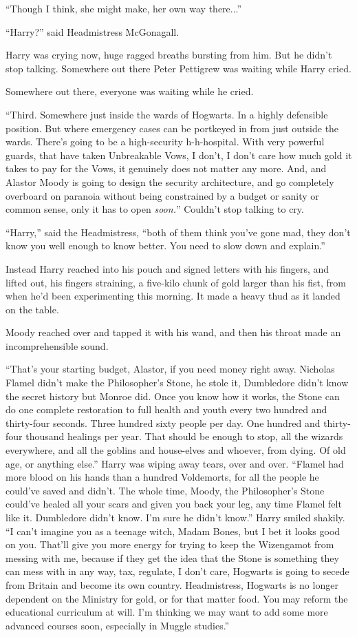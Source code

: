 ``Though I think, she might make, her own way there...''

``Harry?'' said Headmistress McGonagall.

Harry was crying now, huge ragged breaths bursting from him. But he didn't stop talking. Somewhere out there Peter Pettigrew was waiting while Harry cried.

Somewhere out there, everyone was waiting while he cried.

``Third. Somewhere just inside the wards of Hogwarts. In a highly defensible position. But where emergency cases can be portkeyed in from just outside the wards. There's going to be a high-security h-h-hospital. With very powerful guards, that have taken Unbreakable Vows, I don't, I don't care how much gold it takes to pay for the Vows, it genuinely does not matter any more. And, and Alastor Moody is going to design the security architecture, and go completely overboard on paranoia without being constrained by a budget or sanity or common sense, only it has to open \emph{soon.}'' Couldn't stop talking to cry.

``Harry,'' said the Headmistress, ``both of them think you've gone mad, they don't know you well enough to know better. You need to slow down and explain.''

Instead Harry reached into his pouch and signed letters with his fingers, and lifted out, his fingers straining, a five-kilo chunk of gold larger than his fist, from when he'd been experimenting this morning. It made a heavy thud as it landed on the table.

Moody reached over and tapped it with his wand, and then his throat made an incomprehensible sound.

``That's your starting budget, Alastor, if you need money right away. Nicholas Flamel didn't make the Philosopher's Stone, he stole it, Dumbledore didn't know the secret history but Monroe did. Once you know how it works, the Stone can do one complete restoration to full health and youth every two hundred and thirty-four seconds. Three hundred sixty people per day. One hundred and thirty-four thousand healings per year. That should be enough to stop, all the wizards everywhere, and all the goblins and house-elves and whoever, from dying. Of old age, or anything else.'' Harry was wiping away tears, over and over. ``Flamel had more blood on his hands than a hundred Voldemorts, for all the people he could've saved and didn't. The whole time, Moody, the Philosopher's Stone could've healed all your scars and given you back your leg, any time Flamel felt like it. Dumbledore didn't know. I'm sure he didn't know.'' Harry smiled shakily. ``I can't imagine you as a teenage witch, Madam Bones, but I bet it looks good on you. That'll give you more energy for trying to keep the Wizengamot from messing with me, because if they get the idea that the Stone is something they can mess with in any way, tax, regulate, I don't care, Hogwarts is going to secede from Britain and become its own country. Headmistress, Hogwarts is no longer dependent on the Ministry for gold, or for that matter food. You may reform the educational curriculum at will. I'm thinking we may want to add some more advanced courses soon, especially in Muggle studies.''

